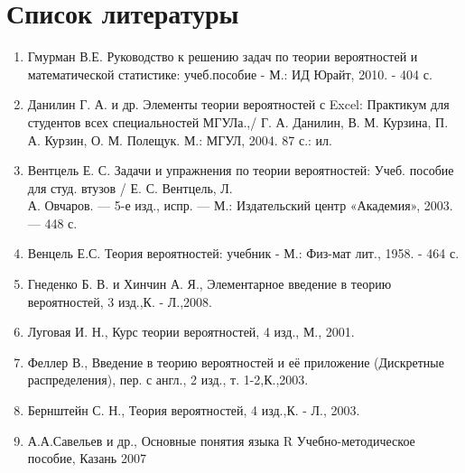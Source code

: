 \chapter{Список литературы}
\begin{enumerate}
\item Гмурман В.Е. Руководство к решению задач по теории вероятностей и математической статистике: учеб.пособие -
М.: ИД Юрайт, 2010. - 404 с.\\
\item  Данилин Г. А. и др. Элементы теории вероятностей с Excel:
Практикум для студентов всех специальностей МГУЛа.,/
Г. А. Данилин, В. М. Курзина, П. А. Курзин, О. М. Полещук. М.: МГУЛ, 2004. 87 с.: ил.\\
\item  Вентцель Е. С. Задачи и упражнения по теории вероятностей: Учеб. пособие для студ. втузов / Е. С. Вентцель, Л.\\
А. Овчаров. — 5-е изд., испр. — М.: Издательский центр
«Академия», 2003. — 448 с.\\
\item  Венцель Е.С. Теория вероятностей: учебник - М.: Физ-мат
лит., 1958. - 464 с.\\
\item Гнеденко Б. В. и Хинчин А. Я., Элементарное введение в теорию вероятностей, 3 изд.,К. - Л.,2008.\\
\item Луговая И. Н., Курс теории вероятностей, 4 изд., М., 2001.\\
\item Феллер В., Введение в теорию вероятностей и её приложение (Дискретные распределения), пер. с англ., 2 изд., т. 1-2,К.,2003.\\
\item Бернштейн С. Н., Теория вероятностей, 4 изд.,К. - Л., 2003.\\
\item А.А.Савельев и др., Основные понятия языка R Учебно-методическое пособие, Казань 2007
\end{enumerate}